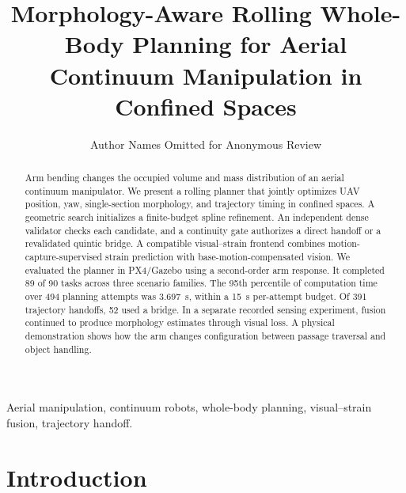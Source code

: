 \documentclass[journal,twoside]{IEEEtran}
\begin{document}
\raggedbottom
\title{Morphology-Aware Rolling Whole-Body Planning for Aerial Continuum Manipulation in Confined Spaces}
\author{Author Names Omitted for Anonymous Review}
\maketitle

\begin{abstract}
Arm bending changes the occupied volume and mass distribution of an aerial continuum manipulator. We present a rolling planner that jointly optimizes UAV position, yaw, single-section morphology, and trajectory timing in confined spaces. A geometric search initializes a finite-budget spline refinement. An independent dense validator checks each candidate, and a continuity gate authorizes a direct handoff or a revalidated quintic bridge. A compatible visual--strain frontend combines motion-capture-supervised strain prediction with base-motion-compensated vision. We evaluated the planner in PX4/Gazebo using a second-order arm response. It completed 89 of 90 tasks across three scenario families. The 95th percentile of computation time over 494 planning attempts was 3.697~s, within a 15~s per-attempt budget. Of 391 trajectory handoffs, 52 used a bridge. In a separate recorded sensing experiment, fusion continued to produce morphology estimates through visual loss. A physical demonstration shows how the arm changes configuration between passage traversal and object handling.

\end{abstract}
\begin{IEEEkeywords}
Aerial manipulation, continuum robots, whole-body planning, visual--strain fusion, trajectory handoff.
\end{IEEEkeywords}

\section{Introduction}\label{sec:intro}

\end{document}
